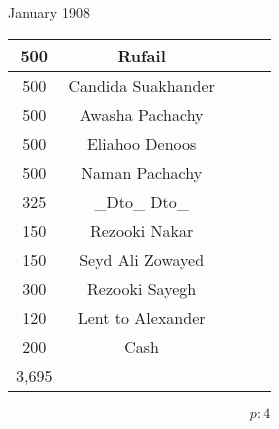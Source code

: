 \documentclass{report}
\begin{document}
	\par{
 	January 1908\ \\
	}

	\begin{tabular}{|ccccc|}
	\hline
	500
	&
Rufail
	&

	&

	&

	\\
  \hline
500
	&
Candida Suakhander
	&

	&

	&

	\\
  \hline
500
	&
Awasha Pachachy
	&

	&

	&

	\\
  \hline
500
	&
Eliahoo Denoos
	&

	&

	&

	\\
  \hline
500
	&
Naman Pachachy
	&

	&

	&

	\\
  \hline
325
	&
_Dto_ Dto_
	&

	&

	&

	\\
  \hline
150
	&
Rezooki Nakar
	&

	&

	&

	\\
  \hline
150
	&
Seyd Ali Zowayed
	&

	&

	&

	\\
  \hline
300
	&
Rezooki Sayegh
	&

	&

	&

	\\
  \hline
120
	&
Lent to Alexander
	&

	&

	&

	\\
  \hline
200
	&
Cash
	&

	&

	&

	\\
  \hline
3,695
	&

	&

	&

	&

	\\
  \hline

	\hline
	\end{tabular}

  \[p: 4 \]

 
 
\end{document}
